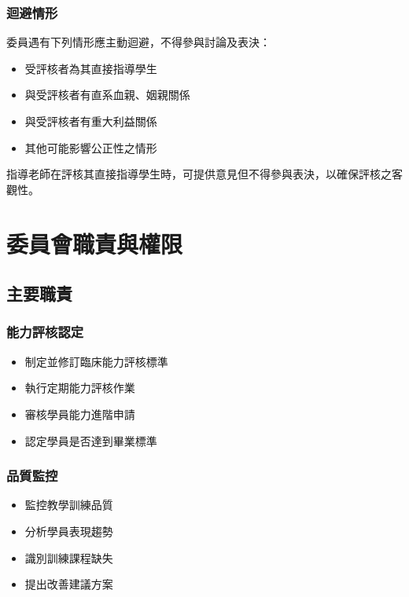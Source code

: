 \documentclass[12pt,a4paper]{article}
\newcommand{\note}[1]{
    \par
    \noindent
    \begin{tcolorbox}[
        colback=emergency_blue!5!white,
        colframe=emergency_blue,
        title=\textbf{重點提醒},
        fonttitle=\bfseries,
        boxrule=0.5pt,
        arc=3pt,
        left=6pt,
        right=6pt,
        top=6pt,
        bottom=6pt
    ]
    #1
    \end{tcolorbox}
}
\begin{document}
\subsubsection{迴避情形}
委員遇有下列情形應主動迴避，不得參與討論及表決：
\begin{itemize}[nosep]
    \item 受評核者為其直接指導學生
    \item 與受評核者有直系血親、姻親關係
    \item 與受評核者有重大利益關係
    \item 其他可能影響公正性之情形
\end{itemize}

\vspace{0.5cm}
\note{
指導老師在評核其直接指導學生時，可提供意見但不得參與表決，以確保評核之客觀性。
}
\section{委員會職責與權限}
\subsection{主要職責}
\subsubsection{能力評核認定}
\begin{itemize}[nosep]
    \item 制定並修訂臨床能力評核標準
    \item 執行定期能力評核作業
    \item 審核學員能力進階申請
    \item 認定學員是否達到畢業標準
\end{itemize}
\subsubsection{品質監控}
\begin{itemize}[nosep]
    \item 監控教學訓練品質
    \item 分析學員表現趨勢
    \item 識別訓練課程缺失
    \item 提出改善建議方案
\end{itemize}
\end{document}
